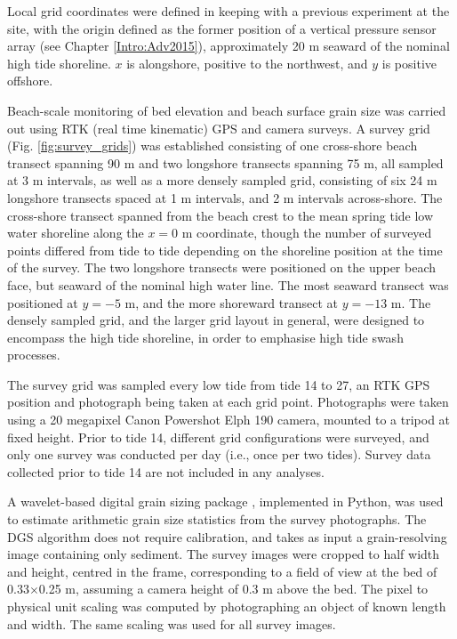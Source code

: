 Local grid coordinates were defined in keeping with a previous experiment at the site, with the origin defined as the former position of a vertical pressure sensor array (see Chapter \ref{Intro:Adv2015}), approximately 20 m seaward of the nominal high tide shoreline. $x$ is alongshore, positive to the northwest, and $y$ is positive offshore.

Beach-scale monitoring of bed elevation and beach surface grain size was carried out using RTK (real time kinematic) GPS and camera surveys. A survey grid (Fig. \ref{fig:survey_grids}) was established consisting of one cross-shore beach transect spanning 90 m and two longshore transects spanning 75 m, all sampled at 3 m intervals, as well as a more densely sampled grid, consisting of six 24 m longshore transects spaced at 1 m intervals, and 2 m intervals across-shore. The cross-shore transect spanned from the beach crest to the mean spring tide low water shoreline along the $x=0$ m coordinate, though the number of surveyed points differed from tide to tide depending on the shoreline position at the time of the survey. The two longshore transects were positioned on the upper beach face, but seaward of the nominal high water line. The most seaward transect was positioned at $y=-5$ m, and the more shoreward transect at $y=-13$ m. The densely sampled grid, and the larger grid layout in general, were designed to encompass the high tide shoreline, in order to emphasise high tide swash processes. 

The survey grid was sampled every low tide from tide 14 to 27, an RTK GPS position and photograph being taken at each grid point. Photographs were taken using a 20 megapixel Canon Powershot Elph 190 camera, mounted to a tripod at fixed height. Prior to tide 14, different grid configurations were surveyed, and only one survey was conducted per day (i.e., once per two tides). Survey data collected prior to tide 14 are not included in any analyses. 

A wavelet-based digital grain sizing package \citep[see][]{Buscombe2013}, implemented in Python, was used to estimate arithmetic grain size statistics from the survey photographs. The DGS algorithm does not require calibration, and takes as input a grain-resolving image containing only sediment. The survey images were cropped to half width and height, centred in the frame, corresponding to a field of view at the bed of 0.33$\times$0.25 m, assuming a camera height of 0.3 m above the bed. The pixel to physical unit scaling was computed by photographing an object of known length and width. The same scaling was used for all survey images.  

